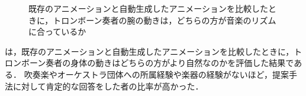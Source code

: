 \begin{figure}[!h]
	\centering
	\caption{既存のアニメーションと自動生成したアニメーションを比較したときに，トロンボーン奏者の腕の動きは，どちらの方が音楽のリズムに合っているか}
	\label{fig:Q2-3}
\end{figure}
\vspace{5mm}
\par
{}は，既存のアニメーションと自動生成したアニメーションを比較したときに，トロンボーン奏者の身体の動きはどちらの方がより自然なのかを評価した結果である．
吹奏楽やオーケストラ団体への所属経験や楽器の経験がないほど，提案手法に対して肯定的な回答をした者の比率が高かった．
